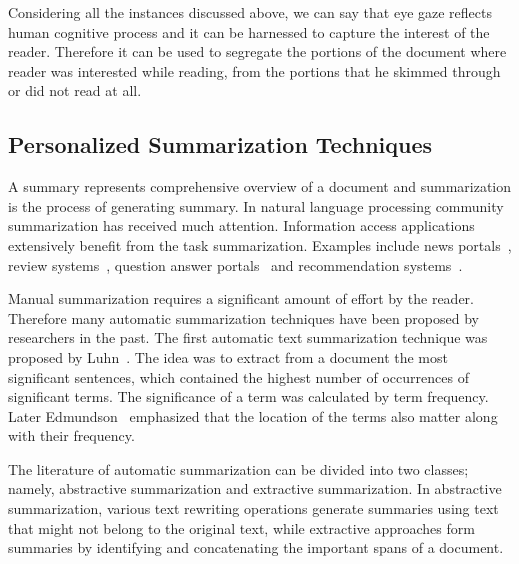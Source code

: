 \documentclass[12pt]{article}
\begin{document}
Considering all the instances discussed above, we can say that eye gaze reflects human cognitive process and it can be harnessed to capture the interest of the reader. Therefore it can be used to segregate the portions of the document where reader was interested while reading, from the portions that he skimmed through or did not read at all.

\subsection{Personalized Summarization Techniques}


A summary represents comprehensive overview of a document and summarization is the process of generating summary. In natural language processing community summarization has received much attention. Information access applications extensively benefit from the task summarization. Examples include news portals~\cite{ge2016news}, review systems~\cite{hu2017opinion}, question answer portals~\cite{pudaruth2016intelligent} and recommendation systems~\cite{roul2019nifty}.

Manual summarization requires a significant amount of effort by the reader. Therefore many automatic summarization techniques have been proposed by researchers in the past. 
The first automatic text summarization technique was proposed by Luhn~\cite{luhn1958automatic}. The idea was to extract from a document the most significant sentences, which contained the highest number of occurrences of significant terms. The significance of a term was calculated by term frequency. 
Later Edmundson~ \cite{edmundson1969new} emphasized that the location of the terms also matter along with their frequency.

The literature of automatic summarization can be divided into two classes; namely, abstractive summarization and extractive summarization. 
In abstractive summarization, various text rewriting operations generate summaries using text that might not belong to the original
text, while extractive approaches form summaries by identifying and concatenating the important spans of a document. 
\end{document}

